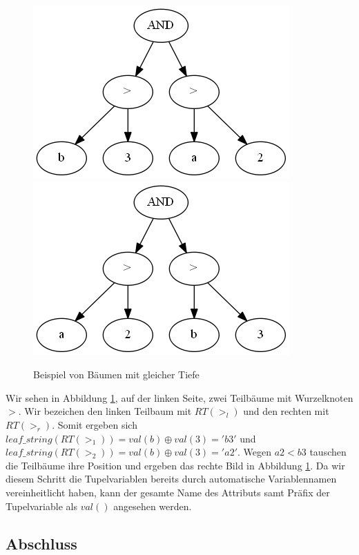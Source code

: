 \begin{figure}[h]
\includegraphics[scale=0.5]{Bilder/same_depth1.png}         \includegraphics[scale=0.5]{Bilder/same_depth2.png}
\caption{Beispiel von Bäumen mit gleicher Tiefe}
\label{fig:bsp1}
\end{figure}

Wir sehen in Abbildung \ref{fig:bsp1}, auf der linken Seite, zwei Teilbäume mit Wurzelknoten $>$. Wir bezeichen den linken Teilbaum mit $RT(>_l)$ und den rechten mit $RT(>_r)$. Somit ergeben sich $\mathit{leaf\_string}(RT(>_1)) = \mathit{val}(b) \oplus  \mathit{val}(3) = 'b3'$ und 
$\mathit{leaf\_string}(RT(>_2)) = \mathit{val}(b) \oplus  \mathit{val}(3) = 'a2'$. Wegen $\mathit{a2} < \mathit{b3}$ tauschen die Teilbäume ihre Position und ergeben das rechte Bild in Abbildung \ref{fig:bsp1}. Da wir diesem Schritt die Tupelvariablen bereits durch automatische Variablennamen vereinheitlicht haben, kann der gesamte Name des Attributs samt Präfix der Tupelvariable als $\mathit{val()}$ angesehen werden.

\subsection{Abschluss}

